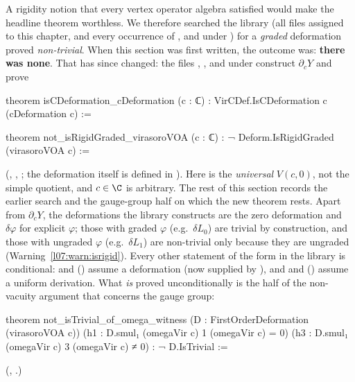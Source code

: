 A rigidity notion that every vertex operator algebra satisfied would make the headline theorem worthless.
We therefore searched the library (all files assigned to this chapter, and every occurrence of
,  and  under ) for a
\emph{graded} deformation proved \emph{non-trivial}. When this section was first written,
the outcome was: \textbf{there was none}. That has since changed: the files ,
,  and  under
 construct $\partial_cY$ and prove
\begin{leancode}
theorem isCDeformation_cDeformation (c : ℂ) : VirCDef.IsCDeformation c (cDeformation c) :=

theorem not_isRigidGraded_virasoroVOA (c : ℂ) : ¬ Deform.IsRigidGraded (virasoroVOA c) :=
\end{leancode}
(\allowbreak{}\allowbreak{}\allowbreak{}, \allowbreak{}\allowbreak{}\allowbreak{}\allowbreak{},
; the deformation  itself is
defined in ). Here  is the
\emph{universal} $V(c,0)$, not the simple quotient, and $c\in\C$ is arbitrary. The rest of this section records the
earlier search and the gauge-group half on which the new theorem rests. Apart from $\partial_cY$, the deformations the
library constructs are the zero deformation and $\delta\varphi$ for explicit $\varphi$; those with graded $\varphi$
(e.g.\ $\delta L_0$) are trivial by construction, and those with ungraded $\varphi$ (e.g.\ $\delta L_1$) are non-trivial
only because they are ungraded (Warning~\ref{l07:warn:isrigid}). Every other statement of the form
 in the library is conditional:  and
 () assume a
deformation (now supplied by ), and 
and  ()
assume a uniform derivation. What \emph{is} proved unconditionally is the half of the non-vacuity argument
that concerns the gauge group:
\begin{leancode}
theorem not_isTrivial_of_omega_witness (D : FirstOrderDeformation (virasoroVOA c))
    (h1 : D.smul₁ (omegaVir c) 1 (omegaVir c) = 0)
    (h3 : D.smul₁ (omegaVir c) 3 (omegaVir c) ≠ 0) : ¬ D.IsTrivial :=
\end{leancode}
(, .)

